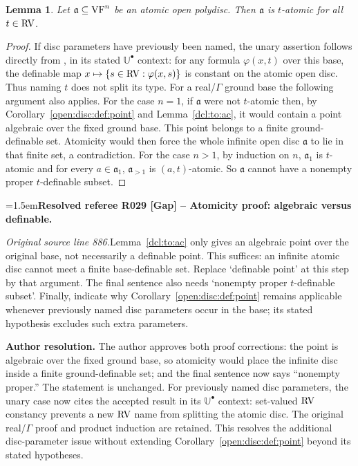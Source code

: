 \documentclass[12pt]{amsart}
\newcommand{\ResolvedRefereeRemark}[5]{%
  \par\medskip\begingroup\normalfont\small\color{gray}%
  \emergencystretch=1.5em\noindent\textbf{Resolved referee R#1 [#2] -- #3.}\par\nobreak\noindent #4\par
  \medskip\color{ResolutionGreen}\noindent\textbf{Author resolution.} #5\par
  \endgroup\medskip
}
\theoremstyle{plain}
\newtheorem{lem}[thm]{Lemma}
\theoremstyle{definition}
\theoremstyle{remark}
\numberwithin{equation}{section}
\theoremstyle{plain}
\newcommand{\VF}{\textup{VF}}
\newcommand{\RV}{\textup{RV}}
\newcommand{\ga}{\mathfrak{a}}
\newcommand{\0}{\emptyset}
\newcommand{\bb}[1]{\mathbb{#1}}
\newcommand{\sub}{\subseteq}
\begin{document}
\begin{lem}\label{at:ball:t}
Let $\ga \sub \VF^n$ be an atomic open polydisc. Then $\ga$ is $t$-atomic for all $t \in \RV$.
\end{lem}
\begin{proof}
{\color{ResolutionGreen}If disc parameters have previously been named, the unary assertion follows directly from \cite[Lemma~3.9]{Yin:int:acvf}, in its stated $\bb U^{\bullet}$ context: for any formula $\varphi(x,t)$ over this base, the definable map $x\mapsto\{s\in\RV:\varphi(x,s)\}$ is constant on the atomic open disc. Thus naming $t$ does not split its type. For a real/$\Gamma$ ground base the following argument also applies.} For the case $n=1$, if $\ga$ were not $t$-atomic then, by Corollary~\ref{open:disc:def:point} and Lemma~\ref{dcl:to:ac}, it would contain a point algebraic over the fixed ground base. This point belongs to a finite ground-definable set. Atomicity would then force the whole infinite open disc $\ga$ to lie in that finite set, a contradiction. For the case $n>1$, by induction on $n$, $\ga_1$ is $t$-atomic and for every $a \in \ga_1$, $\ga_{>1}$ is $(a, t)$-atomic. So $\ga$ cannot have a nonempty proper $t$-definable subset.
\end{proof}

\ResolvedRefereeRemark{029}{Gap}{Atomicity proof: algebraic versus definable}{%
\textit{Original source line 886.}\quad Lemma~\ref{dcl:to:ac} only gives an algebraic point over the original base, not necessarily a definable point. This suffices: an infinite atomic disc cannot meet a finite base-definable set. Replace `definable point' at this step by that argument. The final sentence also needs `nonempty proper $t$-definable subset'. Finally, indicate why Corollary~\ref{open:disc:def:point} remains applicable whenever previously named disc parameters occur in the base; its stated hypothesis excludes such extra parameters.
}{The author approves both proof corrections: the point is algebraic over the fixed ground base, so atomicity would place the infinite disc inside a finite ground-definable set; and the final sentence now says ``nonempty proper.'' The statement is unchanged. For previously named disc parameters, the unary case now cites the accepted result \cite[Lemma~3.9]{Yin:int:acvf} in its $\bb U^{\bullet}$ context: set-valued $\RV$ constancy prevents a new $\RV$ name from splitting the atomic disc. The original real/$\Gamma$ proof and product induction are retained. This resolves the additional disc-parameter issue without extending Corollary~\ref{open:disc:def:point} beyond its stated hypotheses.}
\end{document}
